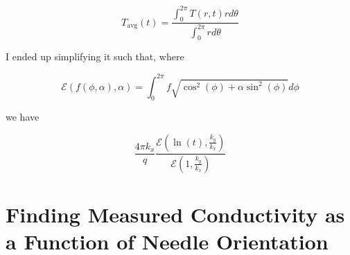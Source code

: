 \begin{equation}
T_{\textrm{avg}}(t) = \frac{ \int_0^{2\pi} T(r,t) rd\theta }
                           { \int_0^{2\pi} rd\theta}
\end{equation}

I ended up simplifying it such that, where

\begin{equation}
\mathcal{E}(f(\phi, \alpha), \alpha) = \int_0^{2\pi} f\sqrt{\cos^2(\phi) + \alpha\sin^2(\phi)} d\phi
\end{equation}

we have

\begin{equation}
\frac{4\pi k_x}{q} \frac{\mathcal{E}(\ln(t), \frac{k_y}{k_x})}{\mathcal{E}(1, \frac{k_y}{k_x})}
\end{equation}

\section{Finding Measured Conductivity as a Function of Needle Orientation}
